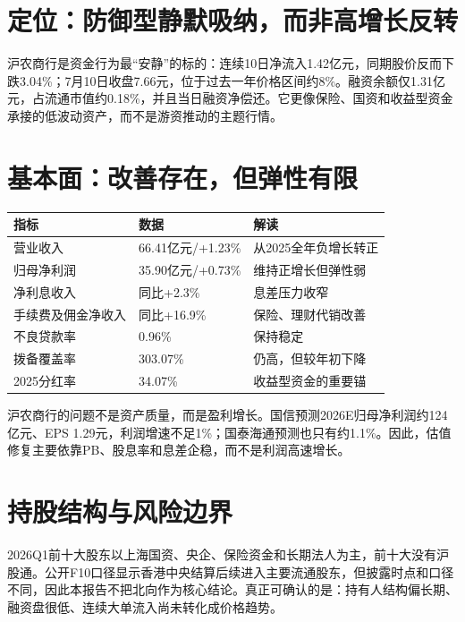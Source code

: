 \section{定位：防御型静默吸纳，而非高增长反转}

沪农商行是资金行为最“安静”的标的：连续10日净流入1.42亿元，同期股价反而下跌3.04\%；7月10日收盘7.66元，位于过去一年价格区间约8\%。融资余额仅1.31亿元，占流通市值约0.18\%，并且当日融资净偿还。它更像保险、国资和收益型资金承接的低波动资产，而不是游资推动的主题行情。

\section{基本面：改善存在，但弹性有限}

\begin{exhibitbox}
\begin{tabularx}{\textwidth}{L{3.4cm}R{2.5cm}X}
\toprule
\textbf{指标} & \textbf{数据} & \textbf{解读} \\
\midrule
营业收入 & 66.41亿元/+1.23\% & 从2025全年负增长转正 \\
归母净利润 & 35.90亿元/+0.73\% & 维持正增长但弹性弱 \\
净利息收入 & 同比+2.3\% & 息差压力收窄 \\
手续费及佣金净收入 & 同比+16.9\% & 保险、理财代销改善 \\
不良贷款率 & 0.96\% & 保持稳定 \\
拨备覆盖率 & 303.07\% & 仍高，但较年初下降 \\
2025分红率 & 34.07\% & 收益型资金的重要锚 \\
\bottomrule
\end{tabularx}
\end{exhibitbox}

沪农商行的问题不是资产质量，而是盈利增长。国信预测2026E归母净利润约124亿元、EPS 1.29元，利润增速不足1\%；国泰海通预测也只有约1.1\%。因此，估值修复主要依靠PB、股息率和息差企稳，而不是利润高速增长。

\section{持股结构与风险边界}

2026Q1前十大股东以上海国资、央企、保险资金和长期法人为主，前十大没有沪股通。公开F10口径显示香港中央结算后续进入主要流通股东，但披露时点和口径不同，因此本报告不把北向作为核心结论。真正可确认的是：持有人结构偏长期、融资盘很低、连续大单流入尚未转化成价格趋势。

